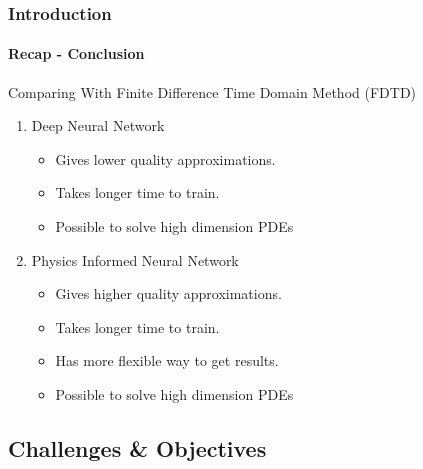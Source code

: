 \begin{frame}
  \frametitle{Introduction}
  \framesubtitle{Recap - Conclusion}
  \begin{block}{Comparing With Finite Difference Time Domain Method (FDTD)}
    \begin{enumerate}
      \item Deep Neural Network \cite{FIRST}
            \begin{itemize}
              \item Gives lower quality approximations.
              \item Takes longer time to train.
              \item Possible to solve high dimension PDEs \vspace*{1em}
            \end{itemize}
      \item Physics Informed Neural Network
            \begin{itemize}
              \item Gives higher quality approximations.
              \item Takes longer time to train.         
              \item Has more flexible way to get results.
              \item Possible to solve high dimension PDEs
            \end{itemize}
    \end{enumerate}    
  \end{block}
\end{frame}


\subsection{Challenges \& Objectives}

